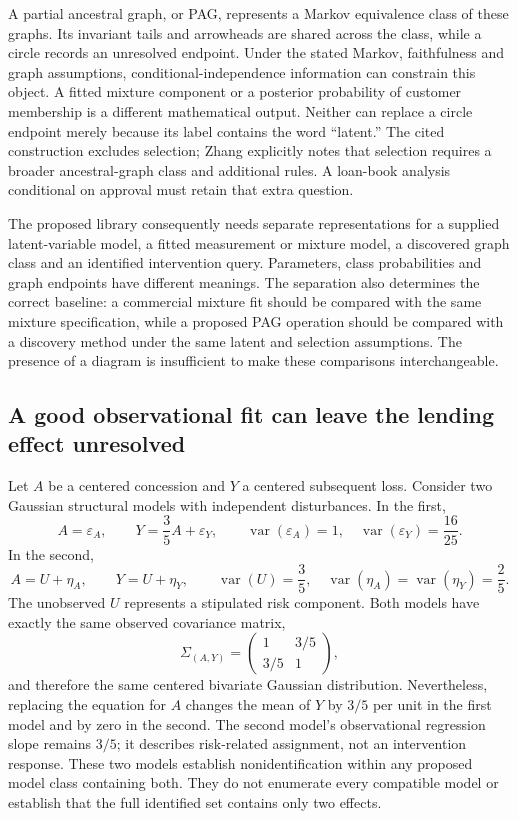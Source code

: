 A partial ancestral graph, or PAG, represents a Markov equivalence class
of these graphs. Its invariant tails and arrowheads are shared across
the class, while a circle records an unresolved endpoint. Under the
stated Markov, faithfulness and graph assumptions,
conditional-independence information can constrain this object. A fitted
mixture component or a posterior probability of customer membership is a
different mathematical output. Neither can replace a circle endpoint
merely because its label contains the word ``latent.'' The cited
construction excludes selection; Zhang explicitly notes that selection
requires a broader ancestral-graph class and additional rules. A
loan-book analysis conditional on approval must retain that extra
question. \citep[pp.1442--1445]{zhang2008}

The proposed library consequently needs separate representations for a
supplied latent-variable model, a fitted measurement or mixture model, a
discovered graph class and an identified intervention query. Parameters,
class probabilities and graph endpoints have different meanings. The
separation also determines the correct baseline: a commercial mixture
fit should be compared with the same mixture specification, while a
proposed PAG operation should be compared with a discovery method under
the same latent and selection assumptions. The presence of a diagram is
insufficient to make these comparisons interchangeable.

\hypertarget{a-good-observational-fit-can-leave-the-lending-effect-unresolved}{%
\subsection{A good observational fit can leave the lending effect
unresolved}\label{a-good-observational-fit-can-leave-the-lending-effect-unresolved}}

Let \(A\) be a centered concession and \(Y\) a centered subsequent loss.
Consider two Gaussian structural models with independent disturbances.
In the first, \[
 A=\varepsilon_A,\qquad
 Y=\frac35 A+\varepsilon_Y,\qquad
 \operatorname{var}(\varepsilon_A)=1,\quad
 \operatorname{var}(\varepsilon_Y)=\frac{16}{25}.
\] In the second, \[
 A=U+\eta_A,\qquad Y=U+\eta_Y,\qquad
 \operatorname{var}(U)=\frac35,\quad
 \operatorname{var}(\eta_A)=\operatorname{var}(\eta_Y)=\frac25.
\] The unobserved \(U\) represents a stipulated risk component. Both
models have exactly the same observed covariance matrix, \[
 \Sigma_{(A,Y)}=
 \begin{pmatrix}1&3/5\\3/5&1\end{pmatrix},
\] and therefore the same centered bivariate Gaussian distribution.
Nevertheless, replacing the equation for \(A\) changes the mean of \(Y\)
by \(3/5\) per unit in the first model and by zero in the second. The
second model's observational regression slope remains \(3/5\); it
describes risk-related assignment, not an intervention response. These
two models establish nonidentification within any proposed model class
containing both. They do not enumerate every compatible model or
establish that the full identified set contains only two effects.
\citep{exec13_latent_examples}

